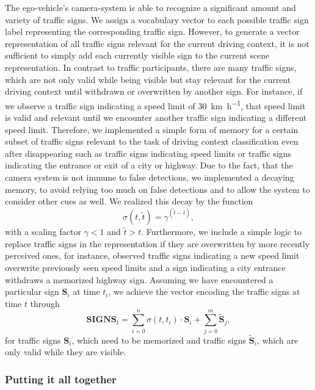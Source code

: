 The ego-vehicle's camera-system is able to recognize a significant amount and variety of traffic signs.
We assign a vocabulary vector to each possible traffic sign label representing the corresponding traffic sign.
However, to generate a vector representation of all traffic signs relevant for the current driving context, it is not sufficient to simply add each currently visible sign to the current scene representation.
In contrast to traffic participants, there are many traffic signs, which are not only valid while being visible but stay relevant for the current driving context until withdrawn or overwritten by another sign.
For instance, if we observe a traffic sign indicating a speed limit of \SI[per-mode=symbol]{30}{\kilo\meter\per\hour}, that speed limit is valid and relevant until we encounter another traffic sign indicating a different speed limit.
Therefore, we implemented a simple form of memory for a certain subset of traffic signs relevant to the task of driving context classification even after disappearing such as traffic signs indicating speed limits or traffic signs indicating the entrance or exit of a city or highway.
Due to the fact, that the camera system is not immune to false detections, we implemented a decaying memory, to avoid relying too much on false detections and to allow the system to consider other cues as well.
We realized this decay by the function 
\begin{equation}
\label{eq:context_class_decay}
\sigma(t, \tilde{t}) = \gamma^{(\tilde{t} - t)},
\end{equation}
with a scaling factor $\gamma < 1$ and $ \tilde{t} > t$.
Furthermore, we include a simple logic to replace traffic signs in the representation if they are overwritten by more recently perceived ones, for instance, observed traffic signs indicating a new speed limit overwrite previously seen speed limits and a sign indicating a city entrance withdraws a memorized highway sign.
Assuming we have encountered a particular sign $\mathbf{S}_{i}$ at time $t_{i}$, we achieve the vector encoding the traffic signs at time $t$ through
\begin{equation}
\label{eq:traffic_sign_context_class}
\mathbf{SIGNS}_{t} = \sum\limits_{i=0}^{n} \sigma(t, t_{i}) \cdot \mathbf{S}_{i} + \sum\limits_{j=0}^{m} \mathbf{\tilde{S}}_{j},
\end{equation}
for traffic signs $ \mathbf{S}_{i}$, which need to be memorized and traffic signs $ \mathbf{ \tilde{S}}_{i}$, which are only valid while they are visible.

\subsubsection{Putting it all together}%
\label{ssubsec:putting_it_all_together}

